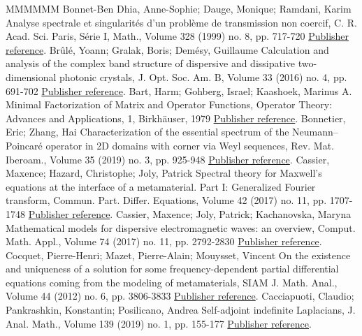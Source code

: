 \documentclass[11pt]{article}
\theoremstyle{definition}
\numberwithin{equation}{section}
\numberwithin{figure}{section}
\numberwithin{table}{section}
\begin{document}
\begin{thebibliography}{MMMMMM}
 Bonnet-Ben Dhia, Anne-Sophie; Dauge, Monique; Ramdani, Karim Analyse spectrale et singularités d’un problème de transmission non coercif, C. R. Acad. Sci. Paris, Série I, Math., Volume 328 (1999) no. 8, pp. 717-720 \href{https://ahl.centre-mersenne.org/item/AHL_2020__3__1161_0/#Bon-Dau-Ram-99}{Publisher reference}.
 Brûlé, Yoann; Gralak, Boris; Demésy, Guillaume Calculation and analysis of the complex band structure of dispersive and dissipative two-dimensional photonic crystals, J. Opt. Soc. Am. B, Volume 33 (2016) no. 4, pp. 691-702 \href{https://ahl.centre-mersenne.org/item/AHL_2020__3__1161_0/#Bru-Gra-Dem-16}{Publisher reference}.
 Bart, Harm; Gohberg, Israel; Kaashoek, Marinus A. Minimal Factorization of Matrix and Operator Functions, Operator Theory: Advances and Applications, 1, Birkhäuser, 1979 \href{https://ahl.centre-mersenne.org/item/AHL_2020__3__1161_0/#Bar-Goh-Kaa-79}{Publisher reference}.
 Bonnetier, Eric; Zhang, Hai Characterization of the essential spectrum of the Neumann–Poincaré operator in 2D domains with corner via Weyl sequences, Rev. Mat. Iberoam., Volume 35 (2019) no. 3, pp. 925-948 \href{https://ahl.centre-mersenne.org/item/AHL_2020__3__1161_0/#Bon-Zha-17}{Publisher reference}.
 Cassier, Maxence; Hazard, Christophe; Joly, Patrick Spectral theory for Maxwell’s equations at the interface of a metamaterial. Part I: Generalized Fourier transform, Commun. Part. Differ. Equations, Volume 42 (2017) no. 11, pp. 1707-1748 \href{https://ahl.centre-mersenne.org/item/AHL_2020__3__1161_0/#Cas-Haz-Jol}{Publisher reference}.
 Cassier, Maxence; Joly, Patrick; Kachanovska, Maryna Mathematical models for dispersive electromagnetic waves: an overview, Comput. Math. Appl., Volume 74 (2017) no. 11, pp. 2792-2830 \href{https://ahl.centre-mersenne.org/item/AHL_2020__3__1161_0/#Cas-Jol-Kac}{Publisher reference}.
 Cocquet, Pierre-Henri; Mazet, Pierre-Alain; Mouysset, Vincent On the existence and uniqueness of a solution for some frequency-dependent partial differential equations coming from the modeling of metamaterials, SIAM J. Math. Anal., Volume 44 (2012) no. 6, pp. 3806-3833 \href{https://ahl.centre-mersenne.org/item/AHL_2020__3__1161_0/#Coc-Maz-Mou-12}{Publisher reference}.
 Cacciapuoti, Claudio; Pankrashkin, Konstantin; Posilicano, Andrea Self-adjoint indefinite Laplacians, J. Anal. Math., Volume 139 (2019) no. 1, pp. 155-177 \href{https://ahl.centre-mersenne.org/item/AHL_2020__3__1161_0/#Cac-Pan-Pos}{Publisher reference}.

\end{thebibliography}
\end{document}
